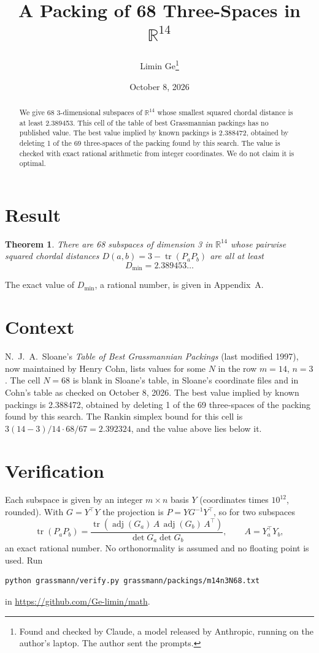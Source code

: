 \documentclass[11pt,a4paper]{article}
\title{A Packing of 68 Three-Spaces in $\mathbb{R}^{14}$}
\author{Limin Ge\thanks{Found and checked by Claude, a model released by Anthropic, running on the author's laptop. The author sent the prompts.}}
\date{October 8, 2026}
\newtheorem*{theorem}{Theorem}
\begin{document}
\maketitle
\begin{abstract}
We give 68 3-dimensional subspaces of $\mathbb{R}^{14}$ whose smallest squared chordal distance is at least 2.389453. This cell of the table of best Grassmannian packings has no published value. The best value implied by known packings is 2.388472, obtained by deleting 1 of the 69 three-spaces of the packing found by this search. The value is checked with exact rational arithmetic from integer coordinates. We do not claim it is optimal.
\end{abstract}

\section{Result}
\begin{theorem}
There are 68 subspaces of dimension 3 in $\mathbb{R}^{14}$ whose pairwise squared chordal distances $D(a,b) = 3 - \operatorname{tr}(P_aP_b)$ are all at least
\[ D_{\min} = 2.389453\ldots \]
\end{theorem}
The exact value of $D_{\min}$, a rational number, is given in Appendix~A.


\section{Context}
N.~J.~A.~Sloane's \emph{Table of Best Grassmannian Packings} (last modified 1997), now maintained by Henry Cohn, lists values for some $N$ in the row $m=14$, $n=3$. The cell $N=68$ is blank in Sloane's table, in Sloane's coordinate files and in Cohn's table as checked on October 8, 2026. The best value implied by known packings is 2.388472, obtained by deleting 1 of the 69 three-spaces of the packing found by this search. The Rankin simplex bound for this cell is $3(14-3)/14\cdot 68/67 = 2.392324$, and the value above lies below it.


\section{Verification}
Each subspace is given by an integer $m\times n$ basis $Y$ (coordinates times $10^{12}$, rounded). With $G=Y^\top Y$ the projection is $P=YG^{-1}Y^\top$, so for two subspaces
\[ \operatorname{tr}(P_aP_b)=\frac{\operatorname{tr}(\operatorname{adj}(G_a)\,A\,\operatorname{adj}(G_b)\,A^\top)}{\det G_a\det G_b},\qquad A=Y_a^\top Y_b, \]
an exact rational number. No orthonormality is assumed and no floating point is used. Run
\begin{verbatim}
python grassmann/verify.py grassmann/packings/m14n3N68.txt
\end{verbatim}
in \url{https://github.com/Ge-limin/math}.
\end{document}

